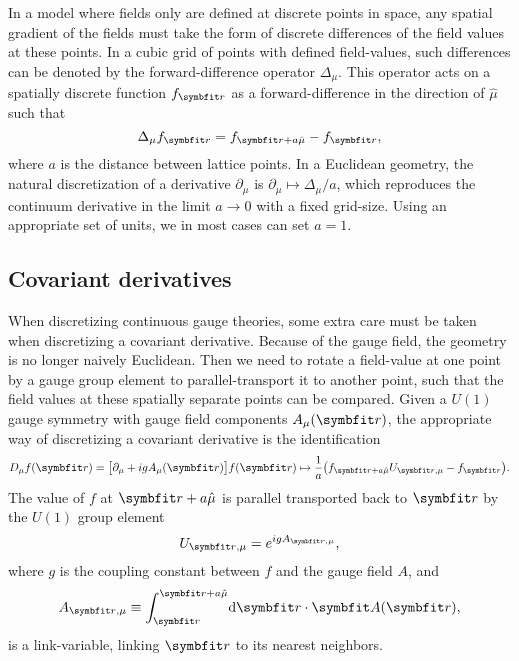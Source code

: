 In a model where fields only are defined at discrete points in space, any spatial gradient of the fields must take the form
of discrete differences of the field values at these points. In a cubic grid of points with defined field-values, such
differences can be denoted by the forward-difference operator $\Delta_\mu$. This operator acts on a spatially discrete function $f_\v{r}$
as a forward-difference in the direction of $\hat{\mu}$ such that
\begin{equation}
    \label{eq:LM:Derivatives:forwardDifference}
    \Delta_\mu f_\v{r} = f_{\v{r}+a\hat{\mu}} - f_\v{r},
\end{equation}
where $a$ is the distance between lattice points.
In a Euclidean geometry, the natural discretization of a derivative $\partial_\mu$ is $\partial_\mu \mapsto \Delta_\mu/a$, which
reproduces the continuum derivative in the limit $a\rightarrow0$ with a fixed grid-size.
Using an appropriate set of units, we in most cases can set $a=1$.

\subsection{Covariant derivatives}

When discretizing continuous gauge theories, some extra care must be taken when discretizing a covariant
derivative. Because of the gauge field, the geometry is no longer naively Euclidean. Then we need to
rotate a field-value at one point by a gauge group element to parallel-transport it to another point, such that the
field values at these spatially separate points can be compared.
Given
a $U(1)$ gauge symmetry with gauge field components $A_\mu(\v{r})$, the appropriate way of discretizing a covariant derivative
is the identification \cite{shimizu12}
\begin{equation}
    \label{eq:LM:Derivatives:covariantDiscreteMapping}
    D_\mu f(\v{r}) = \big[\partial_\mu + igA_\mu(\v{r})\big]f(\v{r}) \mapsto \frac{1}{a}\big(f_{\v{r}+a\hat{\mu}}U_{\v{r},\mu} - f_\v{r}\big).
\end{equation}
The value of $f$ at $\v{r}+a\hat{\mu}$ is parallel transported back to $\v{r}$ by the $U(1)$ group element \cite{Munster2000}
\begin{equation}
    \label{eq:LM:Derivatives:U1ParallelTransporter}
    U_{\v{r},\mu} = e^{igA_{\v{r},\mu}},
\end{equation}
where
$g$ is the coupling constant between $f$ and the gauge field $A$, and
\begin{equation}
    \label{eq:LM:Derivatives:linkVariable}
    A_{\v{r},\mu} \equiv \int_\v{r}^{\v{r}+a\hat{\mu}}\!\mathrm{d}\v{r}\cdot\v{A}(\v{r}),
\end{equation}
is a link-variable, linking $\v{r}$ to its nearest neighbors.

